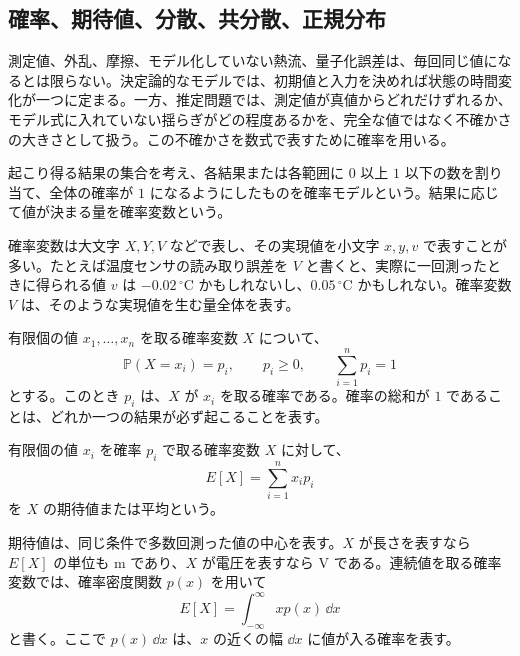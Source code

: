\subsection{確率、期待値、分散、共分散、正規分布}

測定値、外乱、摩擦、モデル化していない熱流、量子化誤差は、毎回同じ値になるとは限らない。決定論的なモデルでは、初期値と入力を決めれば状態の時間変化が一つに定まる。一方、推定問題では、測定値が真値からどれだけずれるか、モデル式に入れていない揺らぎがどの程度あるかを、完全な値ではなく不確かさの大きさとして扱う。この不確かさを数式で表すために確率を用いる。

\begin{definition}[確率モデルと確率変数]
起こり得る結果の集合を考え、各結果または各範囲に $0$ 以上 $1$ 以下の数を割り当て、全体の確率が $1$ になるようにしたものを確率モデルという。結果に応じて値が決まる量を確率変数という。
\end{definition}

確率変数は大文字 $X,Y,V$ などで表し、その実現値を小文字 $x,y,v$ で表すことが多い。たとえば温度センサの読み取り誤差を $V$ と書くと、実際に一回測ったときに得られる値 $v$ は $-0.02\,^\circ\mathrm{C}$ かもしれないし、$0.05\,^\circ\mathrm{C}$ かもしれない。確率変数 $V$ は、そのような実現値を生む量全体を表す。

有限個の値 $x_1,\ldots,x_n$ を取る確率変数 $X$ について、
\begin{equation}
  \mathbb{P}(X=x_i)=p_i,
  \qquad
  p_i\ge0,
  \qquad
  \sum_{i=1}^{n}p_i=1
\end{equation}
とする。このとき $p_i$ は、$X$ が $x_i$ を取る確率である。確率の総和が $1$ であることは、どれか一つの結果が必ず起こることを表す。

\begin{definition}[期待値]
有限個の値 $x_i$ を確率 $p_i$ で取る確率変数 $X$ に対して、
\begin{equation}
  E[X]=\sum_{i=1}^{n}x_i p_i
\end{equation}
を $X$ の期待値または平均という。
\end{definition}

期待値は、同じ条件で多数回測った値の中心を表す。$X$ が長さを表すなら $E[X]$ の単位も m であり、$X$ が電圧を表すなら V である。連続値を取る確率変数では、確率密度関数 $p(x)$ を用いて
\begin{equation}
  E[X]=\int_{-\infty}^{\infty}x p(x)\,\dd x
\end{equation}
と書く。ここで $p(x)\,\dd x$ は、$x$ の近くの幅 $\dd x$ に値が入る確率を表す。

